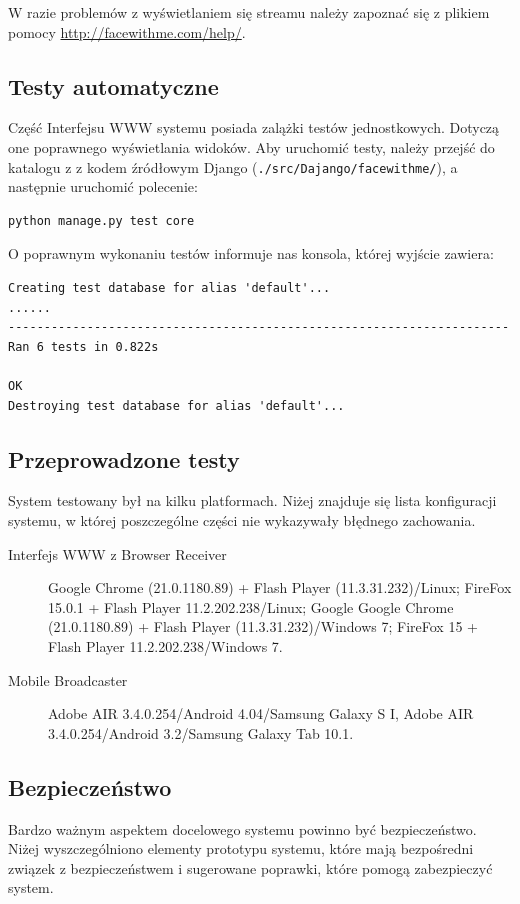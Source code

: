 W razie problemów z wyświetlaniem się streamu należy zapoznać się z plikiem pomocy \url{http://facewithme.com/help/}.

\subsection{Testy automatyczne}

Część Interfejsu WWW systemu posiada zalążki testów jednostkowych. Dotyczą one poprawnego wyświetlania widoków. Aby uruchomić testy, należy przejść do katalogu z z kodem źródłowym Django (\texttt{./src/Dajango/facewithme/}), a następnie uruchomić polecenie:

\lstset{language=Bash}
\begin{lstlisting}
python manage.py test core
\end{lstlisting}

O poprawnym wykonaniu testów informuje nas konsola, której wyjście zawiera:
\begin{lstlisting}
Creating test database for alias 'default'...
......
----------------------------------------------------------------------
Ran 6 tests in 0.822s

OK
Destroying test database for alias 'default'...
\end{lstlisting}

\subsection{Przeprowadzone testy}
\label{sec:EtapIprzeprowadzoneTesty}
System testowany był na kilku platformach. Niżej znajduje się lista konfiguracji systemu, w której poszczególne części nie wykazywały błędnego zachowania.

\begin{description}
    \item[Interfejs WWW z Browser Receiver] Google Chrome (21.0.1180.89) + Flash Player (11.3.31.232)/Linux; FireFox 15.0.1 + Flash Player 11.2.202.238/Linux; Google Google Chrome (21.0.1180.89) + Flash Player (11.3.31.232)/Windows 7;  FireFox 15 + Flash Player 11.2.202.238/Windows 7.
    \item[Mobile Broadcaster] Adobe AIR 3.4.0.254/Android 4.04/Samsung Galaxy S I, Adobe AIR 3.4.0.254/Android 3.2/Samsung Galaxy Tab 10.1.
\end{description}

\subsection{Bezpieczeństwo}
\label{sec:ImplementacjaPrototypuBezpieczenstwo}
Bardzo ważnym aspektem docelowego systemu powinno być bezpieczeństwo. Niżej wyszczególniono elementy prototypu systemu, które mają bezpośredni związek z bezpieczeństwem i sugerowane poprawki, które pomogą zabezpieczyć system.

